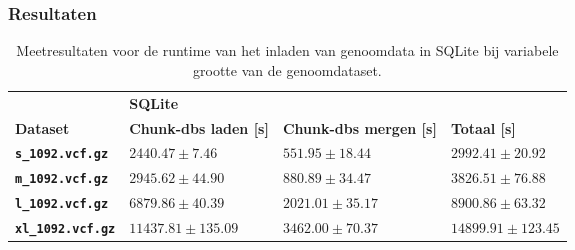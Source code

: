\subsubsection{Resultaten}

\begin{table}[h]
\begin{tabular}{@{}llll@{}}
\cmidrule(l){2-4}
                              & \multicolumn{3}{|l|}{\textbf{SQLite}}                             \\ 
\cmidrule(l){1-4}
\multicolumn{1}{|l|}{\textbf{Dataset}}  & \multicolumn{1}{l|}{\textbf{Chunk-dbs laden [s]}} & \multicolumn{1}{l|}{\textbf{Chunk-dbs mergen [s]}} & \multicolumn{1}{l|}{\textbf{Totaal [s]}} \\ \midrule
\multicolumn{1}{|l|}{\textbf{\texttt{s\_1092.vcf.gz}}} &    \multicolumn{1}{l|}{$2440.47 \pm 7.46$}         & \multicolumn{1}{l|}{$551.95 \pm 18.44$}          & \multicolumn{1}{l|}{$2992.41 \pm 20.92$}                          \\
\multicolumn{1}{|l|}{\textbf{\texttt{m\_1092.vcf.gz}}} &    \multicolumn{1}{l|}{$2945.62 \pm 44.90$}       & \multicolumn{1}{l|}{$880.89 \pm 34.47$}          & \multicolumn{1}{l|}{$3826.51 \pm 76.88$}                          \\
\multicolumn{1}{|l|}{\textbf{\texttt{l\_1092.vcf.gz}}} &    \multicolumn{1}{l|}{$6879.86 \pm 40.39$}       & \multicolumn{1}{l|}{$2021.01 \pm 35.17$}          & \multicolumn{1}{l|}{$8900.86 \pm 63.32$}                          \\
\multicolumn{1}{|l|}{\textbf{\texttt{xl\_1092.vcf.gz}}} &    \multicolumn{1}{l|}{$11437.81 \pm 135.09$}       & \multicolumn{1}{l|}{$3462.00 \pm 70.37$}          & \multicolumn{1}{l|}{$14899.91 \pm 123.45$}                          \\
\bottomrule
\end{tabular}
\caption{Meetresultaten voor de runtime van het inladen van genoomdata in SQLite bij variabele grootte van de genoomdataset.}
\end{table}

